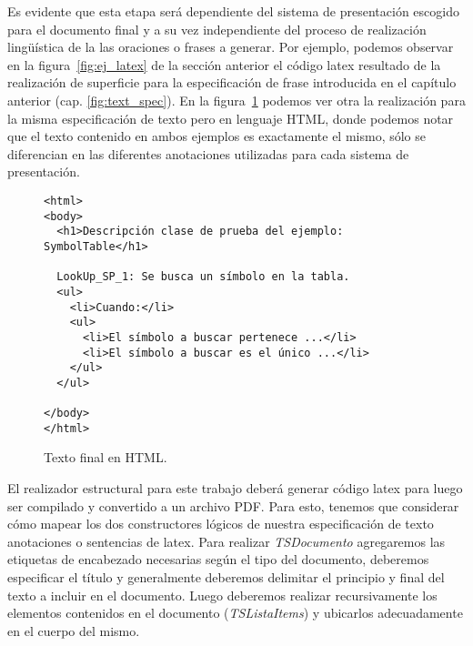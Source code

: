 Es evidente que esta etapa será dependiente del sistema de presentación escogido para el documento final y a su vez independiente del proceso de realización lingüística de la las oraciones o frases a generar.  Por ejemplo, podemos observar en la figura~\ref{fig:ej_latex} de la sección anterior el código latex resultado de la realización de superficie para la especificación de frase introducida en el capítulo anterior (cap. \ref{fig:text_spec}). En la figura~\ref{fig:ej_html} podemos ver otra la realización para la misma especificación de texto pero en lenguaje HTML, donde podemos notar que el texto contenido en ambos ejemplos es exactamente el mismo, sólo se diferencian en las diferentes anotaciones utilizadas para cada sistema de presentación.

\begin{figure}[H]
  \begin{verbatim}
<html>
<body>
  <h1>Descripción clase de prueba del ejemplo: SymbolTable</h1>

  LookUp_SP_1: Se busca un símbolo en la tabla.  
  <ul>
    <li>Cuando:</li>
    <ul>
      <li>El símbolo a buscar pertenece ...</li>
      <li>El símbolo a buscar es el único ...</li>
    </ul>
  </ul>

</body>
</html>
  \end{verbatim}
  \caption{Texto final en HTML.}
  \label{fig:ej_html}
\end{figure}

El realizador estructural para este trabajo deberá generar código latex para luego ser compilado y convertido a un archivo PDF. Para esto, tenemos que considerar cómo mapear los dos constructores lógicos de nuestra especificación de texto anotaciones o sentencias de latex. Para realizar \emph{TSDocumento} agregaremos las etiquetas de encabezado necesarias según el tipo del documento, deberemos especificar el título y generalmente deberemos delimitar el principio y final del texto a incluir en el documento. Luego deberemos realizar recursivamente los elementos contenidos en el documento (\emph{TSListaItems}) y ubicarlos adecuadamente en el cuerpo del mismo.


